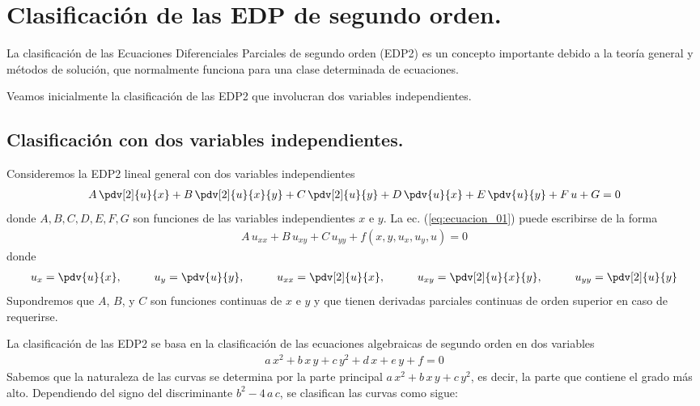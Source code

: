 \section{Clasificación de las EDP de segundo orden.}
La clasificación de las Ecuaciones Diferenciales Parciales de segundo orden (EDP2) es un concepto importante debido a la teoría general y métodos de solución, que normalmente funciona para una clase determinada de ecuaciones. 
\par
Veamos inicialmente la clasificación de las EDP2 que involucran dos variables independientes.
\subsection{Clasificación con dos variables independientes.}
Consideremos la EDP2 lineal general con dos variables independientes
\begin{align}
A \, \pdv[2]{u}{x} + B \, \pdv[2]{u}{x}{y} + C \, \pdv[2]{u}{y} + D \, \pdv{u}{x} + E \, \pdv{u}{y} + F \, u + G = 0
\label{eq:ecuacion_01}
\end{align}
donde $A, B, C, D, E, F, G$ son funciones de las variables independientes $x$ e $y$. La ec. (\ref{eq:ecuacion_01}) puede escribirse de la forma
\begin{align}
A \, u_{xx} + B \, u_{xy} + C \, u_{yy} + f(x, y, u_{x}, u_{y}, u) = 0
\label{eq:ecuacion_02}
\end{align}
donde
\begin{align*}
u_{x} = \pdv{u}{x}, \hspace{1cm} u_{y} = \pdv{u}{y}, \hspace{1cm} u_{xx} = \pdv[2]{u}{x}, \hspace{1cm} u_{xy} = \pdv[2]{u}{x}{y}, \hspace{1cm} u_{yy} = \pdv[2]{u}{y}
\end{align*}
Supondremos que $A$, $B$, y $C$ son funciones continuas de $x$ e $y$ y que tienen derivadas parciales continuas de orden superior en caso de requerirse.
\par
La clasificación de las EDP2 se basa en la clasificación de las ecuaciones algebraicas de segundo orden en dos variables
\begin{align}
a \, x^{2} + b \, x \, y + c \, y^{2} + d \, x + e \, y + f = 0
\label{eq:ecuacion_03}
\end{align}
Sabemos que la naturaleza de las curvas se determina por la parte principal $a \, x^{2} + b \, x \, y + c \, y^{2}$, es decir, la parte que contiene el grado más alto. Dependiendo del signo del discriminante $b^{2} - 4 \, a \, c$, se clasifican las curvas como sigue:
